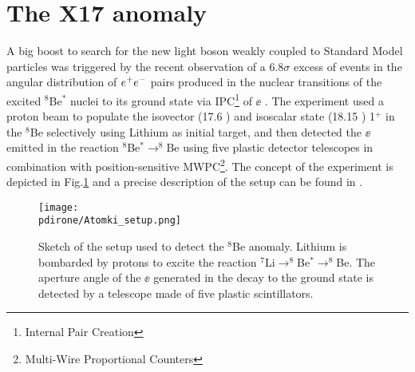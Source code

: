 \section{The X17 anomaly}
\label{ch1:sec:dm-u1model-motivations-x17}

A big boost to search for the new light boson weakly coupled to Standard Model particles was triggered by the recent observation of a 6.8$\sigma$ excess of events in the angular distribution of $e^+e^-$ pairs produced in the nuclear transitions of the excited $^8$Be$^*$ nuclei to its ground state via IPC\footnote{Internal Pair Creation} of $\ee$ \cite{Krasznahorkay:2015iga}. The experiment used a proton beam to populate the isovector (17.6 \mev) and isoscalar state (18.15 \mev) 1$^+$ in the $^8$Be selectively using Lithium as initial target, and then detected the $\ee$ emitted in the reaction $^8$Be$^* \to ^8$Be using five plastic detector telescopes in combination with position-sensitive MWPC\footnote{Multi-Wire Proportional Counters}. The concept of the experiment is depicted in Fig.\ref{fig:x17-setup} and a precise description of the setup can be found in \cite{GULYAS201621}.

\begin{figure}[htb!]
  \centering
  \texttt{[image: \\pdirone/Atomki\_setup.png]}
  \caption[Sketch of the setup used to detect the $^8$Be anomaly.]{Sketch of the setup used to detect the $^8$Be anomaly. Lithium is bombarded by protons to excite the reaction $^7$Li$\to ^8$Be$^* \to ^8$Be. The aperture angle of the $\ee$ generated in the decay to the ground state is detected by a telescope made of five plastic scintillators. \cite{PhysRevD.95.035017}}
  \label{fig:x17-setup}
\end{figure}

